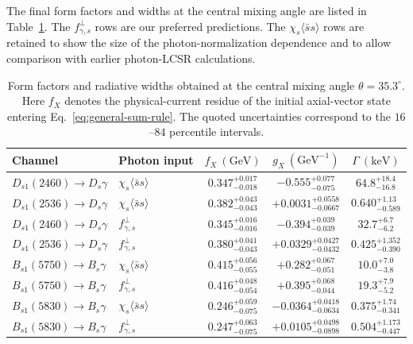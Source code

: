 \documentclass[aps,prd,preprint,nofootinbib,superscriptaddress]{revtex4-2}
\newcommand{\Ds}{D_s}
\newcommand{\Dsone}{D_{s1}}
\newcommand{\Bs}{B_s}
\newcommand{\Bsone}{B_{s1}}
\newcommand{\GeV}{\mathrm{GeV}}
\newcommand{\keV}{\mathrm{keV}}
\begin{document}
The final form factors and widths at the central mixing angle are listed in
Table~\ref{tab:results}.  The $f_{\gamma,s}^{\perp}$ rows are our preferred
predictions.  The $\chi_s\langle\bar s s\rangle$ rows are retained to show the
size of the photon-normalization dependence and to allow comparison with
earlier photon-LCSR calculations.

\begin{widetext}
\begin{table}[t]
\caption{Form factors and radiative widths obtained at the central mixing
angle $\theta=35.3^\circ$.  Here $f_X$ denotes the physical-current residue of
the initial axial-vector state entering Eq.~\eqref{eq:general-sum-rule}.  The
quoted uncertainties correspond to the $16$--$84$ percentile intervals.}
\label{tab:results}
\scriptsize
\begin{ruledtabular}
\begin{tabular}{llccc}
Channel & Photon input & $f_X~(\GeV)$
& $g_X~(\GeV^{-1})$ & $\Gamma~(\keV)$\\
\hline
$\Dsone(2460)\to\Ds\gamma$
& $\chi_s\langle\bar s s\rangle$
& $0.347^{+0.017}_{-0.018}$
& $-0.555^{+0.077}_{-0.075}$
& $64.8^{+18.4}_{-16.8}$\\

$\Dsone(2536)\to\Ds\gamma$
& $\chi_s\langle\bar s s\rangle$
& $0.382^{+0.043}_{-0.043}$
& $+0.0031^{+0.0558}_{-0.0667}$
& $0.640^{+1.13}_{-0.589}$\\

$\Dsone(2460)\to\Ds\gamma$
& $f_{\gamma,s}^{\perp}$
& $0.345^{+0.016}_{-0.016}$
& $-0.394^{+0.039}_{-0.039}$
& $32.7^{+6.7}_{-6.2}$\\

$\Dsone(2536)\to\Ds\gamma$
& $f_{\gamma,s}^{\perp}$
& $0.380^{+0.041}_{-0.043}$
& $+0.0329^{+0.0427}_{-0.0432}$
& $0.425^{+1.352}_{-0.390}$\\

$\Bsone(5750)\to\Bs\gamma$
& $\chi_s\langle\bar s s\rangle$
& $0.415^{+0.056}_{-0.055}$
& $+0.282^{+0.067}_{-0.051}$
& $10.0^{+7.0}_{-3.8}$\\

$\Bsone(5750)\to\Bs\gamma$
& $f_{\gamma,s}^{\perp}$
& $0.416^{+0.048}_{-0.054}$
& $+0.395^{+0.068}_{-0.044}$
& $19.3^{+7.9}_{-5.2}$\\

$\Bsone(5830)\to\Bs\gamma$
& $\chi_s\langle\bar s s\rangle$
& $0.246^{+0.059}_{-0.075}$
& $-0.0364^{+0.0418}_{-0.0634}$
& $0.375^{+1.74}_{-0.341}$\\

$\Bsone(5830)\to\Bs\gamma$
& $f_{\gamma,s}^{\perp}$
& $0.247^{+0.063}_{-0.075}$
& $+0.0105^{+0.0498}_{-0.0898}$
& $0.504^{+1.173}_{-0.447}$\\
\end{tabular}
\end{ruledtabular}
\end{table}
\end{widetext}
\end{document}
